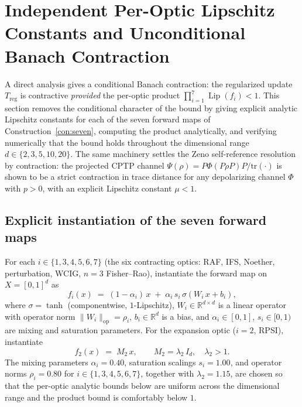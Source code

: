 \documentclass[11pt,a4paper]{article}
\theoremstyle{plain}
\theoremstyle{definition}
\theoremstyle{remark}
\newcommand{\RR}{\mathbb{R}}
\DeclareMathOperator{\Lip}{Lip}
\begin{document}

\section{Independent Per-Optic Lipschitz Constants and Unconditional Banach Contraction}\label{sec:lipschitz}

A direct analysis gives a conditional Banach contraction:
the regularized update $T_{\mathrm{reg}}$ is contractive \emph{provided}
the per-optic product $\prod_{i=1}^{7}\Lip(f_{i})<1$. This section
removes the conditional character of the bound by giving explicit
analytic Lipschitz constants for each of the seven forward maps of
Construction~\ref{con:seven}, computing the product analytically, and
verifying numerically that the bound holds throughout the dimensional
range $d\in\{2,3,5,10,20\}$. The same machinery settles
the Zeno self-reference resolution by
contraction: the projected CPTP channel
$\Psi(\rho)=P\Phi(P\rho P)P/\mathrm{tr}(\cdot)$ is shown to be a strict
contraction in trace distance for any depolarizing channel $\Phi$ with
$p>0$, with an explicit Lipschitz constant $\mu<1$.

\subsection{Explicit instantiation of the seven forward maps}

For each $i\in\{1,3,4,5,6,7\}$ (the six contracting optics: RAF, IFS,
Noether, perturbation, WCIG, $n=3$ Fisher--Rao), instantiate the
forward map on $X=[0,1]^{d}$ as
\begin{equation}\label{eq:fi-contracting}
  f_{i}(x) \;=\; (1-\alpha_{i})\,x \;+\; \alpha_{i}\,s_{i}\,\sigma(W_{i}\,x+b_{i}),
\end{equation}
where $\sigma=\tanh$ (componentwise, $1$-Lipschitz), $W_{i}\in\RR^{d\times
d}$ is a linear operator with operator norm $\|W_{i}\|_{\mathrm{op}}=\rho_{i}$,
$b_{i}\in\RR^{d}$ is a bias, and $\alpha_{i}\in[0,1]$, $s_{i}\in[0,1)$
are mixing and saturation parameters. For the expansion optic
($i=2$, RPSI), instantiate
\begin{equation}\label{eq:f2-expansion}
  f_{2}(x) \;=\; M_{2}\,x,\qquad M_{2}=\lambda_{2}\,I_{d},\quad \lambda_{2}>1.
\end{equation}
The mixing parameters $\alpha_{i}=0.40$, saturation scalings
$s_{i}=1.00$, and operator norms $\rho_{i}=0.80$ for $i\in
\{1,3,4,5,6,7\}$, together with $\lambda_{2}=1.15$, are chosen so
that the per-optic analytic bounds below are uniform across the
dimensional range and the product bound is comfortably below $1$.
\end{document}
